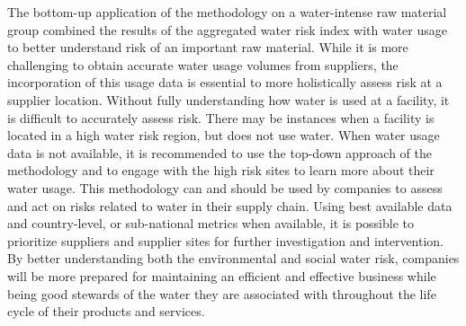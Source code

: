 \documentclass[a4paper]{article}
\begin{document}
The bottom-up application of the methodology on a water-intense raw material group combined the results of the aggregated water risk index with water usage to better understand risk of an important raw material.  
While it is more challenging to obtain accurate water usage volumes from suppliers, the incorporation of this usage data is essential to more holistically assess risk at a supplier location. 
Without fully understanding how water is used at a facility, it is difficult to accurately assess risk.
 There may be instances when a facility is located in a high water risk region, but does not use water.
  When water usage data is not available, it is recommended to use the top-down approach of the methodology and to engage with the high risk sites to learn more about their water usage. 
This methodology can and should be used by companies to assess and act on risks related to water in their supply chain. 
  Using best available data and country-level, or sub-national metrics when available, it is possible to prioritize suppliers and supplier sites for further investigation and intervention. 
  By better understanding both the environmental and social water risk, companies will be more prepared for maintaining an efficient and effective business while being good stewards of the water they are associated with throughout the life cycle of their products and services.




\end{document}
